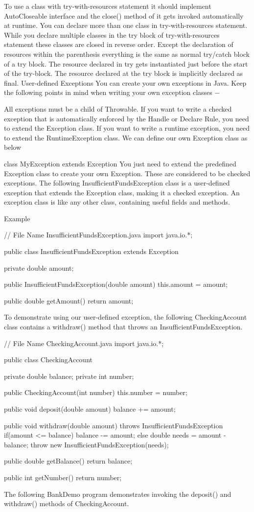 To use a class with try-with-resources statement it should implement AutoCloseable interface and the close() method of it gets invoked automatically at runtime.
You can declare more than one class in try-with-resources statement.
While you declare multiple classes in the try block of try-with-resources statement these classes are closed in reverse order.
Except the declaration of resources within the parenthesis everything is the same as normal try/catch block of a try block.
The resource declared in try gets instantiated just before the start of the try-block.
The resource declared at the try block is implicitly declared as final.
User-defined Exceptions
You can create your own exceptions in Java. Keep the following points in mind when writing your own exception classes −

All exceptions must be a child of Throwable.
If you want to write a checked exception that is automatically enforced by the Handle or Declare Rule, you need to extend the Exception class.
If you want to write a runtime exception, you need to extend the RuntimeException class.
We can define our own Exception class as below

class MyException extends Exception {
}
You just need to extend the predefined Exception class to create your own Exception. These are considered to be checked exceptions. The following InsufficientFundsException class is a user-defined exception that extends the Exception class, making it a checked exception. An exception class is like any other class, containing useful fields and methods.

Example

// File Name InsufficientFundsException.java
import java.io.*;

public class InsufficientFundsException extends Exception {
   private double amount;

   public InsufficientFundsException(double amount) {
      this.amount = amount;
   }

   public double getAmount() {
      return amount;
   }
}
To demonstrate using our user-defined exception, the following CheckingAccount class contains a withdraw() method that throws an InsufficientFundsException.

// File Name CheckingAccount.java
import java.io.*;

public class CheckingAccount {
   private double balance;
   private int number;

   public CheckingAccount(int number) {
      this.number = number;
   }

   public void deposit(double amount) {
      balance += amount;
   }

   public void withdraw(double amount) throws InsufficientFundsException {
      if(amount <= balance) {
         balance -= amount;
      }else {
         double needs = amount - balance;
         throw new InsufficientFundsException(needs);
      }
   }

   public double getBalance() {
      return balance;
   }

   public int getNumber() {
      return number;
   }
}
The following BankDemo program demonstrates invoking the deposit() and withdraw() methods of CheckingAccount.

